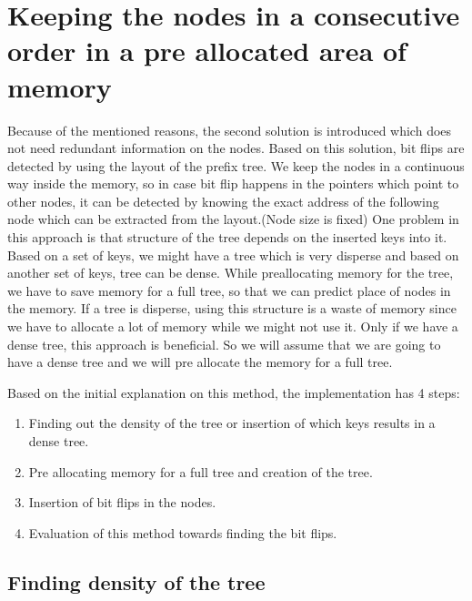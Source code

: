 \documentclass[12pt]{report}
\begin{document}
\section{Keeping the nodes in a consecutive order in a pre allocated area of memory}

 Because of the mentioned reasons, the second solution is introduced which does not need redundant information on the nodes. Based on this solution, bit flips are detected by using the layout of the prefix tree. We keep the nodes in a continuous way inside the memory, so in case bit flip happens in the pointers which point to other nodes, it can be detected by knowing the exact address of the following node which can be extracted from the layout.(Node size is fixed) One problem in this approach is that structure of the tree depends on the inserted keys into it. Based on a set of keys, we might have a tree which is very disperse and based on another set of keys, tree can be dense. While preallocating memory for the tree, we have to save memory for a full tree, so that we can predict place of nodes in the memory. If a tree is disperse, using this structure is a waste of memory since we have to allocate a lot of memory while we might not use it. Only if we have a dense tree, this approach is beneficial. So we will assume that we are going to have a dense tree and we will pre allocate the memory for a full tree.

Based on the initial explanation on this method, the implementation has 4 steps:

\begin{enumerate}
  \item Finding out the density of the tree or insertion of which keys results in a dense tree.
  \item Pre allocating memory for a full tree and creation of the tree.
  \item Insertion of bit flips in the nodes.
  \item Evaluation of this method towards finding the bit flips.
\end{enumerate}  

\subsection{Finding density of the tree}
\end{document}
